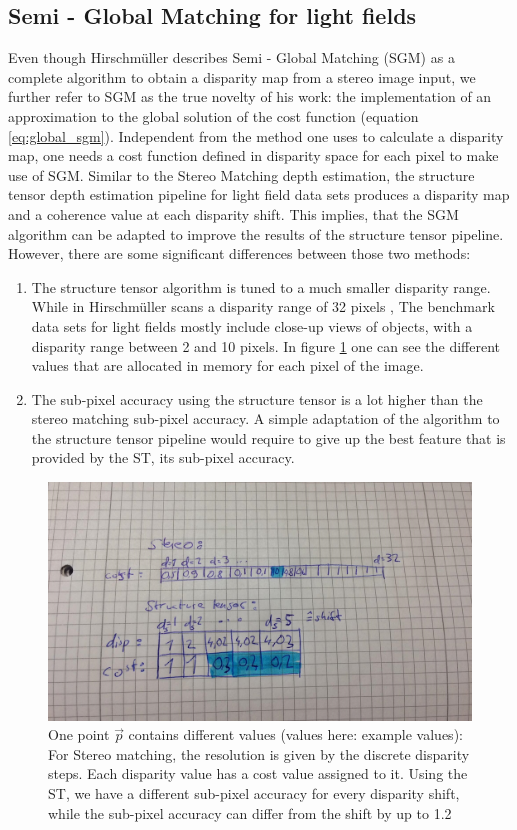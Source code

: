 \documentclass  [
  paper    = a4,
  BCOR     = 10mm,
  twoside,
  fontsize = 12pt,
  fleqn,
  toc      = bibnumbered,
  toc      = listofnumbered,
  numbers  = noendperiod,
  headings = normal,
  listof   = leveldown,
  version  = 3.03
]                                       {scrreprt}
\begin{document}
\subsection{Semi - Global Matching for light fields}
Even though Hirschmüller describes Semi - Global Matching (SGM) as a complete algorithm to obtain a disparity map from a stereo image input, we further refer to SGM as the true novelty of his work: the implementation of an approximation to the global solution of the cost function (equation \ref{eq:global_sgm}). Independent from the method one uses to calculate a disparity map,  one needs a cost function defined in disparity space for each pixel to make use of SGM. 
Similar to the Stereo Matching depth estimation, the structure tensor depth estimation pipeline for light field data sets produces a disparity map and a coherence value at each disparity shift. This implies, that the SGM algorithm can be adapted to improve the results of the structure tensor pipeline. However, there are some significant differences between those two methods:
\begin{enumerate}
	\item The structure tensor algorithm is tuned to a much smaller disparity range. While in \cite{hirschmuller2005accurate} Hirschmüller scans a disparity range of 32 pixels , The benchmark data sets for light fields mostly include close-up views of objects, with a disparity range between 2 and 10 pixels. In figure \ref{fig:table-skizze} one can see the different values that are allocated in memory for each pixel of the image.
	\item The sub-pixel accuracy using the structure tensor is a lot higher than the stereo matching sub-pixel accuracy. A simple adaptation of the algorithm to the structure tensor pipeline would require to give up the best feature that is provided by the ST, its sub-pixel accuracy.
\end{enumerate}
\begin{figure}[h]
	\centering
	\includegraphics[width=0.7\linewidth]{images/table-skizze}
	\caption[Example values: One point $\vec p$ contains different values]{One point $\vec p$ contains different values (values here: example values): For Stereo matching, the resolution is given by the discrete disparity steps. Each disparity value has a cost value assigned to it. Using the ST, we have a different sub-pixel accuracy for every disparity shift, while the sub-pixel accuracy can differ from the shift by up to 1.2 }
	\label{fig:table-skizze}
\end{figure}
\end{document}
